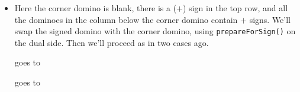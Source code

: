\documentclass[12pt]{article}
\numberwithin{equation}{section}
\newcommand{\horizontalDominoRSShift}[4]{\filldraw [dominoRSStyle] (#2 - 1 + #4 + \eps, #1 - 1 + \eps) rectangle + (2 - \teps, 1 -\teps) node [dominoText] {$#3$};}
\newcommand{\verticalDominoRSShift}[4]{\filldraw [dominoRSStyle] (#2 - 1 + #4 + \eps,  #1 - 1 + \eps) rectangle + (1 - \teps,2 -\teps) node [dominoText] {$#3$};}
\begin{document}
\begin{itemize}
\begin{itemize}
      \item Here the corner domino is blank, there is a ($+$) sign in the top row, and all the dominoes in the column below the corner domino contain $+$ signs.
      We'll swap the signed domino with the corner domino, using \texttt{prepareForSign()} on the dual side.
      Then we'll proceed as in two cases ago.
      \begin{figure}[H]
        \centering
      \end{figure}
      goes to
      \begin{figure}[H]
        \centering
      \end{figure}
      goes to
      \begin{figure}[H]

\end{figure}
\end{itemize}
\end{itemize}
\end{document}

